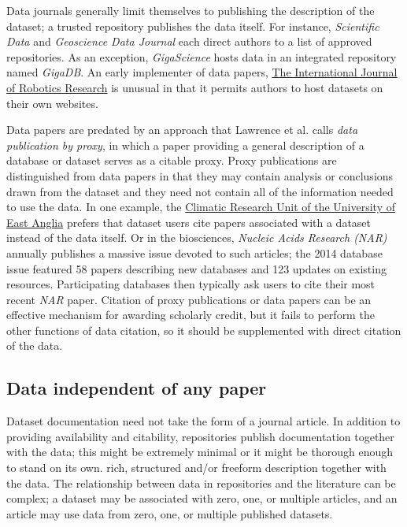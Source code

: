 \documentclass[10pt,a4paper,twocolumn]{article}
\begin{document}
{Data journals generally limit themselves to publishing the description of the dataset; a trusted repository publishes the data itself.
For instance, \emph{Scientific Data} and \emph{Geoscience Data Journal} each direct authors to a list of approved repositories.
As an exception, \emph{GigaScience} hosts data in an integrated repository named \emph{GigaDB}.
An early implementer of data papers, \href{http://www.ijrr.org/}{The International Journal of Robotics Research}\cite{newman_data_2009} is unusual in that it permits authors to host datasets on their own websites.

Data papers are predated by an approach that Lawrence et al. calls \emph{data publication by proxy}, in which a paper providing a general description of a database or dataset serves as a citable proxy\cite{lawrence_data_2013}.
Proxy publications are distinguished from data papers in that they may contain analysis or conclusions drawn from the dataset and they need not contain all of the information needed to use the data.
In one example, the \href{http://www.cru.uea.ac.uk/}{Climatic Research Unit of the University of East Anglia} prefers that dataset users cite papers associated with a dataset instead of the data itself.
Or in the biosciences, \emph{Nucleic Acids Research (NAR)} annually publishes a massive issue devoted to such articles; the 2014 database issue featured 58 papers describing new databases and 123 updates on existing resources\cite{fernandez-suarez_2014_2014}.
Participating databases then typically ask users to cite their most recent \emph{NAR} paper.
Citation of proxy publications or data papers can be an effective mechanism for awarding scholarly credit, but it fails to perform the other functions of data citation, so it should be supplemented with direct citation of the data.

\subsection*{Data independent of any paper}\label{paper-independent-data}

Dataset documentation need not take the form of a journal article.
In addition to providing availability and citability, repositories publish documentation together with the data; this might be extremely minimal or it might be thorough enough to stand on its own.
rich, structured and/or freeform description together with the data.
The relationship between data in repositories and the literature can be complex; a dataset may be associated with zero, one, or multiple articles, and an article may use data from zero, one, or multiple published datasets.

}
\end{document}
